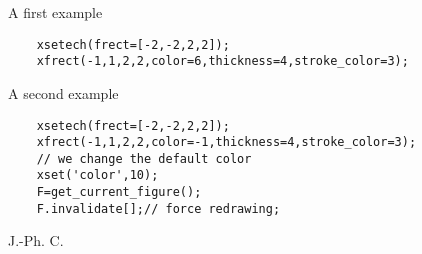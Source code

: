 \begin{examples}

A first example

  \begin{Verbatim}
    xsetech(frect=[-2,-2,2,2]);
    xfrect(-1,1,2,2,color=6,thickness=4,stroke_color=3);
  \end{Verbatim}

A second example

  \begin{Verbatim}
    xsetech(frect=[-2,-2,2,2]);
    xfrect(-1,1,2,2,color=-1,thickness=4,stroke_color=3);
    // we change the default color
    xset('color',10);
    F=get_current_figure();
    F.invalidate[];// force redrawing;
  \end{Verbatim}
\end{examples}
\begin{manseealso}
    
\end{manseealso}
\begin{authors}
  J.-Ph. C.  
\end{authors}

